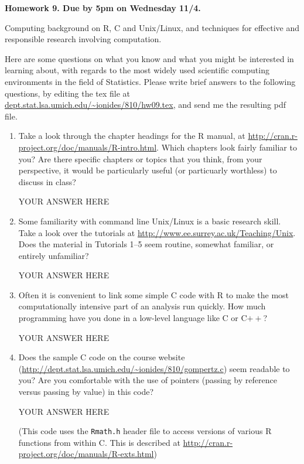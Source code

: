 \documentclass[12pt]{article}
\begin{document}
\begin{center}\bf
Homework 9. Due by 5pm on Wednesday 11/4.

Computing background on R, C and Unix/Linux, and techniques for effective and responsible research involving computation.

\end{center}

Here are some questions on what you know and what you might be interested in learning about, with regards to the most widely used scientific computing environments in the field of Statistics. Please write brief answers to the following questions, by editing the tex file at \url{dept.stat.lsa.umich.edu/~ionides/810/hw09.tex}, and send me the resulting pdf file. 

\begin{enumerate}

\item Take a look through the chapter headings for the R manual, at
\url{http://cran.r-project.org/doc/manuals/R-intro.html}. Which chapters look fairly familiar to you? Are there specific chapters or topics that you think, from your perspective, it would be particularly useful (or particuarly worthless) to discuss in class?

YOUR ANSWER HERE

\item Some familiarity with command line Unix/Linux is a basic research skill. Take a look over the tutorials at \url{http://www.ee.surrey.ac.uk/Teaching/Unix}. Does the material in Tutorials 1--5 seem routine, somewhat familiar, or entirely unfamiliar?

YOUR ANSWER HERE

\item Often it is convenient to link some simple C code with R to make the most computationally intensive part of an analysis run quickly. How much programming have you done in a low-level language like C or C$++$? 

YOUR ANSWER HERE

\item Does the sample C code on the course website (\url{http://dept.stat.lsa.umich.edu/~ionides/810/gompertz.c}) seem readable to you? Are you comfortable with the use of pointers (passing by reference versus passing by value) in this code?

YOUR ANSWER HERE

(This code uses the \texttt{Rmath.h} header file to access versions of various R functions from within C. This is described at \url{http://cran.r-project.org/doc/manuals/R-exts.html})



\end{enumerate}
\end{document}
